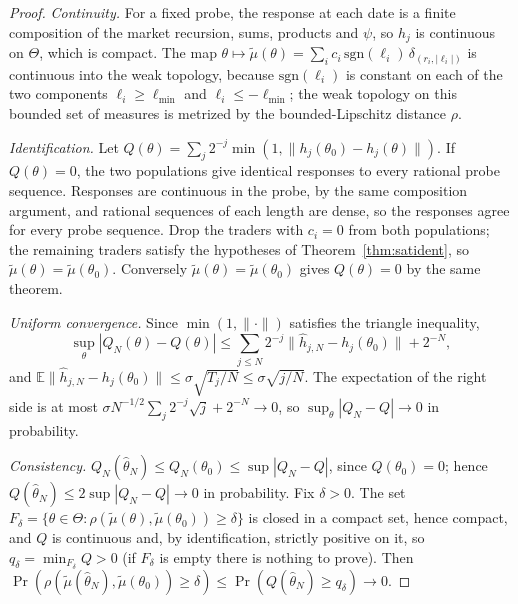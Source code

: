 \begin{proof}
\emph{Continuity.} For a fixed probe, the response at each date is a finite composition of the market recursion, sums, products and $\psi$, so $h_j$ is continuous on $\Theta$, which is compact. The map $\theta\mapsto\tilde\mu(\theta)=\sum_ic_i\,\mathrm{sgn}(\ell_i)\,\delta_{(r_i,|\ell_i|)}$ is continuous into the weak topology, because $\mathrm{sgn}(\ell_i)$ is constant on each of the two components $\ell_i\ge\ell_{\min}$ and $\ell_i\le-\ell_{\min}$; the weak topology on this bounded set of measures is metrized by the bounded-Lipschitz distance $\rho$.

\emph{Identification.} Let $Q(\theta)=\sum_j2^{-j}\min(1,\|h_j(\theta_0)-h_j(\theta)\|)$. If $Q(\theta)=0$, the two populations give identical responses to every rational probe sequence. Responses are continuous in the probe, by the same composition argument, and rational sequences of each length are dense, so the responses agree for every probe sequence. Drop the traders with $c_i=0$ from both populations; the remaining traders satisfy the hypotheses of Theorem~\ref{thm:satident}, so $\tilde\mu(\theta)=\tilde\mu(\theta_0)$. Conversely $\tilde\mu(\theta)=\tilde\mu(\theta_0)$ gives $Q(\theta)=0$ by the same theorem.

\emph{Uniform convergence.} Since $\min(1,\|\cdot\|)$ satisfies the triangle inequality,
\[
 \sup_\theta|Q_N(\theta)-Q(\theta)|\le\sum_{j\le N}2^{-j}\|\hat h_{j,N}-h_j(\theta_0)\|+2^{-N},
\]
and $\mathbb E\|\hat h_{j,N}-h_j(\theta_0)\|\le\sigma\sqrt{T_j/N}\le\sigma\sqrt{j/N}$. The expectation of the right side is at most $\sigma N^{-1/2}\sum_j2^{-j}\sqrt j+2^{-N}\to0$, so $\sup_\theta|Q_N-Q|\to0$ in probability.

\emph{Consistency.} $Q_N(\hat\theta_N)\le Q_N(\theta_0)\le\sup|Q_N-Q|$, since $Q(\theta_0)=0$; hence $Q(\hat\theta_N)\le2\sup|Q_N-Q|\to0$ in probability. Fix $\delta>0$. The set $F_\delta=\{\theta\in\Theta:\rho(\tilde\mu(\theta),\tilde\mu(\theta_0))\ge\delta\}$ is closed in a compact set, hence compact, and $Q$ is continuous and, by identification, strictly positive on it, so $q_\delta=\min_{F_\delta}Q>0$ (if $F_\delta$ is empty there is nothing to prove). Then $\Pr(\rho(\tilde\mu(\hat\theta_N),\tilde\mu(\theta_0))\ge\delta)\le\Pr(Q(\hat\theta_N)\ge q_\delta)\to0$.
\end{proof}

